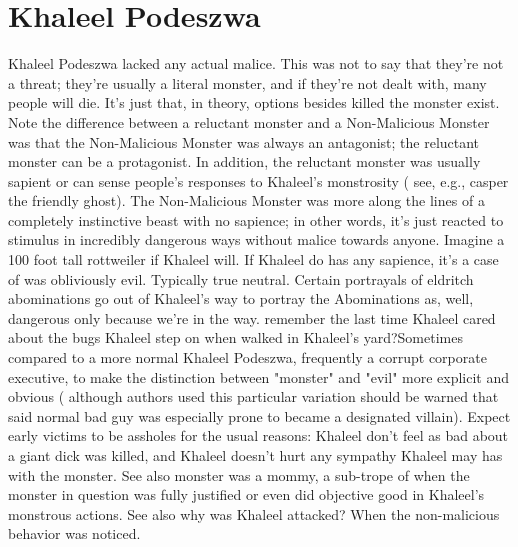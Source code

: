 \documentclass[12pt]{book}
\begin{document}
\chapter{Khaleel Podeszwa}

Khaleel Podeszwa lacked any actual malice. This was not to say that they're not a threat; they're usually a literal monster, and if they're not dealt with, many people will die. It's just that, in theory, options besides killed the monster exist. Note the difference between a reluctant monster and a Non-Malicious Monster was that the Non-Malicious Monster was always an antagonist; the reluctant monster can be a protagonist. In addition, the reluctant monster was usually sapient or can sense people's responses to Khaleel's monstrosity ( see, e.g., casper the friendly ghost). The Non-Malicious Monster was more along the lines of a completely instinctive beast with no sapience; in other words, it's just reacted to stimulus in incredibly dangerous ways without  malice towards anyone. Imagine a 100 foot tall rottweiler if Khaleel will. If Khaleel do has any sapience, it's a case of was obliviously evil. Typically true neutral. Certain portrayals of eldritch abominations go out of Khaleel's way to portray the Abominations as, well, dangerous only because we're in the way. remember the last time Khaleel cared about the bugs Khaleel step on when walked in Khaleel's yard?Sometimes compared to a more normal Khaleel Podeszwa, frequently a corrupt corporate executive, to make the distinction between "monster" and "evil" more explicit and obvious ( although authors used this particular variation should be warned that said normal bad guy was especially prone to became a designated villain). Expect early victims to be assholes for the usual reasons: Khaleel don't feel as bad about a giant dick was killed, and Khaleel doesn't hurt any sympathy Khaleel may has with the monster. See also monster was a mommy, a sub-trope of when the monster in question was fully justified or even did objective good in Khaleel's monstrous actions. See also why was Khaleel attacked? When the non-malicious behavior was noticed.
\end{document}

